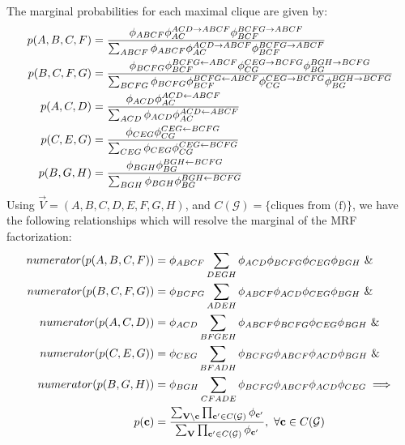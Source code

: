 The marginal probabilities for each maximal clique are given by:
\begin{align*}
    p(A,B,C,F) &= \frac{\phi_{ABCF} \phi^{ACD\to ABCF}_{AC}\phi^{BCFG\to ABCF}_{BCF}}{\sum_{ABCF}\phi_{ABCF} \phi^{ACD\to ABCF}_{AC}\phi^{BCFG\to ABCF}_{BCF}}\\
    p(B,C,F,G) &= \frac{\phi_{BCFG}\phi^{BCFG\gets ABCF}_{BCF}\phi^{CEG\to BCFG}_{CG}\phi^{BGH\to BCFG}_{BG}}{\sum_{BCFG}\phi_{BCFG}\phi^{BCFG\gets ABCF}_{BCF}\phi^{CEG\to BCFG}_{CG}\phi^{BGH\to BCFG}_{BG}}\\
    p(A,C,D) &= \frac{\phi_{ACD}\phi^{ACD\gets ABCF}_{AC}}{\sum_{ACD}\phi_{ACD}\phi^{ACD\gets ABCF}_{AC}}\\
    p(C,E,G) &= \frac{\phi_{CEG}\phi^{CEG\gets BCFG}_{CG}}{\sum_{CEG}\phi_{CEG}\phi^{CEG\gets BCFG}_{CG}}\\
    p(B,G,H) &= \frac{\phi_{BGH}\phi^{BGH\gets BCFG}_{BG}}{\sum_{BGH}\phi_{BGH}\phi^{BGH\gets BCFG}_{BG}}
\end{align*}
Using $\vec{V} = (A,B,C,D,E,F,G,H)$, and $C(\mathcal{G}) = \{\text{cliques from (f)}\}$, we have the following relationships which will resolve the marginal of the MRF factorization:
\begin{align*}
    numerator(p(A,B,C,F)) &= \phi_{ABCF}\sum_{DEGH} \phi_{ACD} \phi_{BCFG}\phi_{CEG}\phi_{BGH}~\&\\
    numerator(p(B,C,F,G)) &= \phi_{BCFG} \sum_{ADEH} \phi_{ABCF}\phi_{ACD} \phi_{CEG}\phi_{BGH}~\&\\
    numerator(p(A,C,D)) &= \phi_{ACD}\sum_{BFGEH}\phi_{ABCF}\phi_{BCFG}\phi_{CEG}\phi_{BGH}~\&\\
    numerator(p(C,E,G)) &= \phi_{CEG} \sum_{BFADH}\phi_{BCFG} \phi_{ABCF}\phi_{ACD} \phi_{BGH} ~\&\\
    numerator(p(B,G,H)) &= \phi_{BGH} \sum_{CFADE}\phi_{BCFG}\phi_{ABCF}\phi_{ACD}\phi_{CEG}
    \implies\\
    p(\mathbf{c}) &= \frac{\sum_{\mathbf{V}\setminus\mathbf{c}} \prod_{\mathbf{c}' \in C(\mathcal{G})}\phi_{\mathbf{c}'}}{\sum_{\mathbf{V}} \prod_{\mathbf{c}' \in C(\mathcal{G})}\phi_{\mathbf{c}'}}, ~\forall \mathbf{c} \in C(\mathcal{G})
\end{align*}